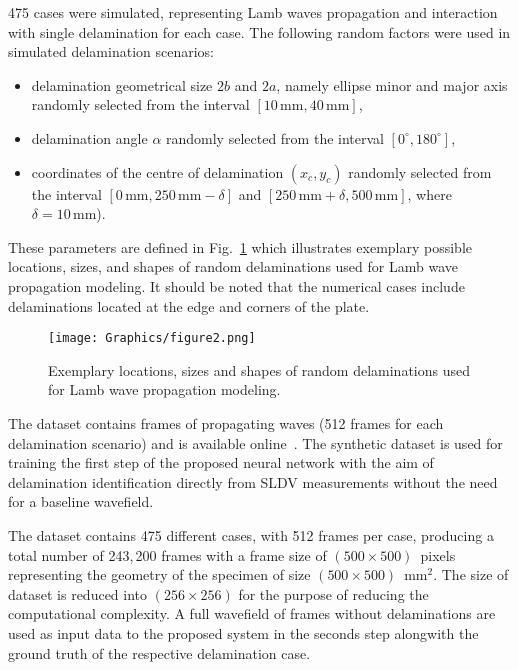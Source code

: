 475 cases were simulated, representing Lamb waves propagation and interaction 
with single delamination for each case. 
The following random factors were used in simulated delamination scenarios:
\begin{itemize}
	\item delamination geometrical size	\(2b\) and \(2a\), namely ellipse minor 
	and major axis randomly selected from the interval \newline \(\left[10 \, 
	\textrm{mm}, 40\, \textrm{mm}\right]\),
	\item delamination angle \(\alpha\) randomly selected from the interval \( 
	\left[ 0^{\circ}, 180^{\circ} \right]\),
	\item coordinates of the centre of delamination \((x_c,y_c)\) randomly 
	selected from the interval \(\left[0\, \textrm{mm}, 250\, \textrm{mm} 
	-\delta \right]\) and \newline \( \left[250\, \textrm{mm}+\delta, 500\, 
	\textrm{mm} 
	\right] \), where \(\delta = 10\, \textrm{mm}\)).
\end{itemize}
These parameters are defined in Fig.~\ref{fig:random_delaminations} which 
illustrates exemplary possible locations, sizes, and shapes of random 
delaminations used for Lamb wave propagation modeling.
It should be noted that the numerical cases include delaminations located at 
the edge and corners of the plate.
\begin{figure} [h!]
	\begin{center}
		\texttt{[image: Graphics/figure2.png]}
	\end{center}
	\caption{Exemplary locations, sizes and shapes of random delaminations used 
		for Lamb wave propagation modeling.} 
	\label{fig:random_delaminations}
\end{figure}

The dataset contains frames of propagating waves (512  frames for each 
delamination scenario) and is available online~\cite{kudela_pawel_2021_5414555}.
The synthetic dataset is used for training the first step of the proposed 
neural network with the aim of delamination identification directly from SLDV 
measurements without the need for a baseline wavefield.

The dataset contains 475 different cases, with 512 frames 
per case, producing a total number of 243,\,200 frames with a frame size of 
\((500\times500)\)~pixels representing the geometry of the specimen of size 
\((500\times500)\)~mm\(^{2}\).
The size of dataset is reduced into \((256\times256)\) for the purpose of 
reducing the computational complexity.
A full wavefield of frames without delaminations are used as input data to the 
proposed system in the seconds step alongwith the ground truth of the 
respective delamination case.
